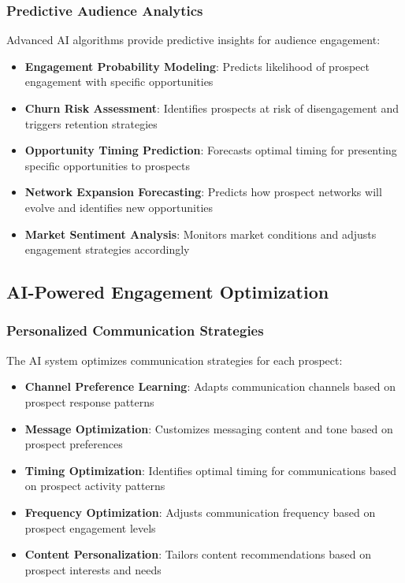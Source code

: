 \subsubsection{Predictive Audience Analytics}

Advanced AI algorithms provide predictive insights for audience engagement:

\begin{itemize}
    \item \textbf{Engagement Probability Modeling}: Predicts likelihood of prospect engagement with specific opportunities
    \item \textbf{Churn Risk Assessment}: Identifies prospects at risk of disengagement and triggers retention strategies
    \item \textbf{Opportunity Timing Prediction}: Forecasts optimal timing for presenting specific opportunities to prospects
    \item \textbf{Network Expansion Forecasting}: Predicts how prospect networks will evolve and identifies new opportunities
    \item \textbf{Market Sentiment Analysis}: Monitors market conditions and adjusts engagement strategies accordingly
\end{itemize}

\subsection{AI-Powered Engagement Optimization}

\subsubsection{Personalized Communication Strategies}

The AI system optimizes communication strategies for each prospect:

\begin{itemize}
    \item \textbf{Channel Preference Learning}: Adapts communication channels based on prospect response patterns
    \item \textbf{Message Optimization}: Customizes messaging content and tone based on prospect preferences
    \item \textbf{Timing Optimization}: Identifies optimal timing for communications based on prospect activity patterns
    \item \textbf{Frequency Optimization}: Adjusts communication frequency based on prospect engagement levels
    \item \textbf{Content Personalization}: Tailors content recommendations based on prospect interests and needs
\end{itemize}

